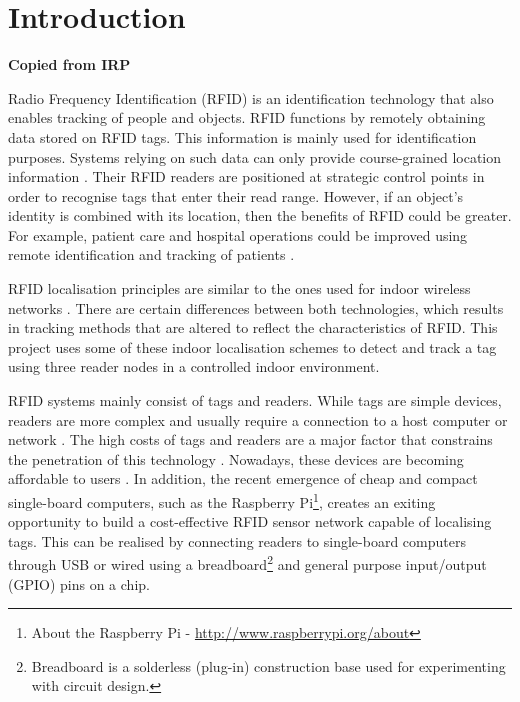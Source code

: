 \chapter{Introduction}
\label{ch:introduction}

\textbf{Copied from IRP}

Radio Frequency Identification (RFID) is an identification technology that also enables tracking of people and objects. RFID functions by remotely obtaining data stored on RFID tags. This information is mainly used for identification purposes. Systems relying on such data can only provide course-grained location information \cite{Bouet2008}. Their RFID readers are positioned at strategic control points in order to recognise tags that enter their read range. However, if an object's identity is combined with its location, then the benefits of RFID could be greater. For example, patient care and hospital operations could be improved using remote identification and tracking of patients \cite{Cangialosi2007}.

RFID localisation principles are similar to the ones used for indoor wireless networks \cite{Bouet2008}. There are certain differences between both technologies, which results in tracking methods that are altered to reflect the characteristics of RFID. This project uses some of these indoor localisation schemes to detect and track a tag using three reader nodes in a controlled indoor environment. 

RFID systems mainly consist of tags and readers. While tags are simple devices, readers are more complex and usually require a connection to a host computer or network \cite{Landt2005}. The high costs of tags and readers are a major factor that constrains the penetration of this technology \cite{Want2006}. Nowadays, these devices are becoming affordable to users . In addition, the recent emergence of cheap and compact single-board computers, such as the Raspberry Pi\footnote{About the Raspberry Pi - \url{http://www.raspberrypi.org/about}}, creates an exiting opportunity to build a cost-effective RFID sensor network capable of localising tags. This can be realised by connecting readers to single-board computers through USB or wired using a breadboard\footnote{Breadboard is a solderless (plug-in) construction base used for experimenting with circuit design.} and general purpose input/output (GPIO) pins on a chip.

